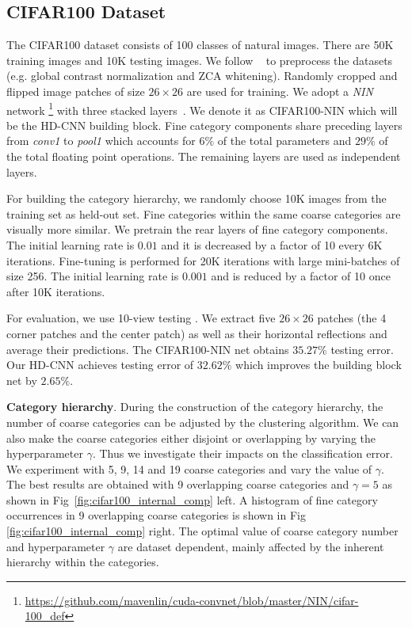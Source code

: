\documentclass[10pt,twocolumn,letterpaper]{article}
\begin{document}
\subsection{CIFAR100 Dataset}
\label{sec:cifar100_nin}
The CIFAR100 dataset consists of 100 classes of natural images. There are 50K training images and 10K testing images. We follow ~\cite{goodfellow2013maxout} to preprocess the datasets (e.g. global contrast normalization and ZCA whitening). Randomly cropped and flipped image patches of size $26 \times 26$ are used for training. We adopt a \textit{NIN} network \footnote{\url{https://github.com/mavenlin/cuda-convnet/blob/master/NIN/cifar-100_def}} with three stacked layers~\cite{LinCY13}. 
We denote it as CIFAR100-NIN which will be the HD-CNN building block. Fine category components share preceding layers from \textit{conv1} to \textit{pool1} which accounts for $6\%$ of the total parameters and $29\%$ of the total floating point operations. The remaining layers are used as independent layers.


For building the category hierarchy, we randomly choose 10K images from the training set as  held-out set. Fine categories within the same coarse categories are visually more similar. We pretrain the rear layers of fine category components. The initial learning rate is $0.01$ and it is decreased by a factor of 10 every 6K iterations. Fine-tuning is performed for 20K iterations with large mini-batches of size 256. The initial learning rate is $0.001$ and is reduced by a factor of 10 once after 10K iterations.

For evaluation, we use 10-view testing \cite{krizhevsky2012imagenet}. We extract five $26 \times 26$ patches (the 4 corner patches and the center patch) as well as their horizontal reflections and average their predictions. The CIFAR100-NIN net obtains $35.27\%$ testing error. Our HD-CNN achieves testing error of $32.62\%$ which improves the building block net by $2.65\%$. 

\noindent \textbf{Category hierarchy}. 
During the construction of the category hierarchy, the number of coarse categories can be adjusted by the clustering algorithm. We can also make the coarse categories either disjoint or overlapping by varying the hyperparameter $\gamma$. Thus we investigate their impacts on the classification error. We experiment with 5, 9, 14 and 19 coarse categories and vary the value of $\gamma$. The best results are obtained with 9 overlapping coarse categories and $\gamma = 5$ as shown in Fig~\ref{fig:cifar100_internal_comp} left. A histogram of fine category occurrences in 9 overlapping coarse categories is shown in Fig \ref{fig:cifar100_internal_comp} right. 
The optimal value of coarse category number and hyperparameter $\gamma$ are dataset dependent, mainly affected by the inherent hierarchy within the categories. 
\end{document}
